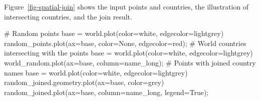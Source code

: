 \documentclass[
  letterpaper,
]{krantz}
\newenvironment{Shaded}{\begin{snugshade}}{\end{snugshade}}
\newcommand{\CommentTok}[1]{\textcolor[rgb]{0.37,0.37,0.37}{#1}}
\newcommand{\NormalTok}[1]{\textcolor[rgb]{0.00,0.23,0.31}{#1}}
\newcommand{\OperatorTok}[1]{\textcolor[rgb]{0.37,0.37,0.37}{#1}}
\newcommand{\StringTok}[1]{\textcolor[rgb]{0.13,0.47,0.30}{#1}}
\newcommand{\VariableTok}[1]{\textcolor[rgb]{0.07,0.07,0.07}{#1}}
\begin{document}
Figure~\ref{fig-spatial-join} shows the input points and countries, the
illustration of intersecting countries, and the join result.

\begin{Shaded}
\begin{Highlighting}[]
\CommentTok{\# Random points}
\NormalTok{base }\OperatorTok{=}\NormalTok{ world.plot(color}\OperatorTok{=}\StringTok{\textquotesingle{}white\textquotesingle{}}\NormalTok{, edgecolor}\OperatorTok{=}\StringTok{\textquotesingle{}lightgrey\textquotesingle{}}\NormalTok{)}
\NormalTok{random\_points.plot(ax}\OperatorTok{=}\NormalTok{base, color}\OperatorTok{=}\StringTok{\textquotesingle{}None\textquotesingle{}}\NormalTok{, edgecolor}\OperatorTok{=}\StringTok{\textquotesingle{}red\textquotesingle{}}\NormalTok{)}\OperatorTok{;}
\CommentTok{\# World countries intersecting with the points}
\NormalTok{base }\OperatorTok{=}\NormalTok{ world.plot(color}\OperatorTok{=}\StringTok{\textquotesingle{}white\textquotesingle{}}\NormalTok{, edgecolor}\OperatorTok{=}\StringTok{\textquotesingle{}lightgrey\textquotesingle{}}\NormalTok{)}
\NormalTok{world\_random.plot(ax}\OperatorTok{=}\NormalTok{base, column}\OperatorTok{=}\StringTok{\textquotesingle{}name\_long\textquotesingle{}}\NormalTok{)}\OperatorTok{;}
\CommentTok{\# Points with joined country names}
\NormalTok{base }\OperatorTok{=}\NormalTok{ world.plot(color}\OperatorTok{=}\StringTok{\textquotesingle{}white\textquotesingle{}}\NormalTok{, edgecolor}\OperatorTok{=}\StringTok{\textquotesingle{}lightgrey\textquotesingle{}}\NormalTok{)}
\NormalTok{random\_joined.geometry.plot(ax}\OperatorTok{=}\NormalTok{base, color}\OperatorTok{=}\StringTok{\textquotesingle{}grey\textquotesingle{}}\NormalTok{)}
\NormalTok{random\_joined.plot(ax}\OperatorTok{=}\NormalTok{base, column}\OperatorTok{=}\StringTok{\textquotesingle{}name\_long\textquotesingle{}}\NormalTok{, legend}\OperatorTok{=}\VariableTok{True}\NormalTok{)}\OperatorTok{;}
\end{Highlighting}
\end{Shaded}
\end{document}
